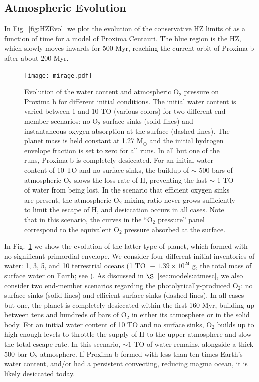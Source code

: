 \documentclass[preprint,12pt]{aastex}
\begin{document}
\subsection{Atmospheric Evolution}
\label{sec:results:atmesc}

In Fig.~\ref{fig:HZEvol} we plot the evolution of the conservative HZ limits of \cite{Kopparapu13} as a function of time for a model of Proxima Centauri. The blue region is the HZ, which slowly moves inwards for 500 Myr, reaching the current orbit of Proxima b after about 200 Myr.

\begin{figure}[ht]
\centering
\texttt{[image: mirage.pdf]}
\caption{Evolution of the water content and atmospheric O$_2$ pressure
  on Proxima b for different initial conditions. The initial water
  content is varied between 1 and 10 TO (various colors) for two
  different end-member scenarios: no O$_2$ surface sinks (solid lines)
  and instantaneous oxygen absorption at the surface (dashed
  lines). The planet mass is held constant at 1.27 M$_\oplus$ and the
  initial hydrogen envelope fraction is set to zero for all runs. In
  all but one of the runs, Proxima b is completely desiccated. For an
  initial water content of 10 TO and no surface sinks, the buildup of
  $\sim$ 500 bars of atmospheric O$_2$ slows the loss rate of H,
  preventing the last $\sim$ 1 TO of water from being lost. In the
  scenario that efficient oxygen sinks are present, the atmospheric
  O$_2$ mixing ratio never grows sufficiently to limit the escape of
  H, and desiccation occurs in all cases. Note that in this scenario,
  the curves in the ``O$_2$ pressure'' panel correspond to the
  equivalent O$_2$ pressure absorbed at the surface.}
\label{fig:atmesc:mirage}
\end{figure}

In Fig.~\ref{fig:atmesc:mirage} we show the evolution of the latter
type of planet, which formed with no significant primordial
envelope. We consider four different initial inventories of water: 1,
3, 5, and 10 terrestrial oceans (1 TO $\equiv 1.39\times 10^{24}$ g,
the total mass of surface water on Earth; see \cite{Kasting88}). As
discussed in $\S$~\ref{sec:models:atmesc}, we also consider two end-member
scenarios regarding the photolytically-produced O$_2$: no surface
sinks (solid lines) and efficient surface sinks (dashed lines). In all
cases but one, the planet is completely desiccated within the first
160 Myr, building up between tens and hundreds of bars of O$_2$ in
either its atmosphere or in the solid body. For an initial water
content of 10 TO and no surface sinks, O$_2$ builds up to high enough
levels to throttle the supply of H to the upper atmosphere and slow
the total escape rate. In this scenario, $\sim 1$ TO of water remains,
alongside a thick 500 bar O$_2$ atmosphere. If Proxima b formed with
less than ten times Earth's water content, and/or had a persistent
convecting, reducing magma ocean, it is likely desiccated today.
\end{document}
